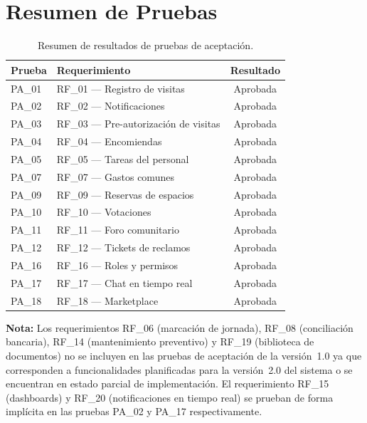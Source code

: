 \section{Resumen de Pruebas}

\begin{table}[H]
\centering
\small
\begin{tabular}{|l|l|c|}
\hline
\textbf{Prueba} & \textbf{Requerimiento} & \textbf{Resultado} \\ \hline
PA\_01 & RF\_01 — Registro de visitas & Aprobada \\ \hline
PA\_02 & RF\_02 — Notificaciones & Aprobada \\ \hline
PA\_03 & RF\_03 — Pre-autorización de visitas & Aprobada \\ \hline
PA\_04 & RF\_04 — Encomiendas & Aprobada \\ \hline
PA\_05 & RF\_05 — Tareas del personal & Aprobada \\ \hline
PA\_07 & RF\_07 — Gastos comunes & Aprobada \\ \hline
PA\_09 & RF\_09 — Reservas de espacios & Aprobada \\ \hline
PA\_10 & RF\_10 — Votaciones & Aprobada \\ \hline
PA\_11 & RF\_11 — Foro comunitario & Aprobada \\ \hline
PA\_12 & RF\_12 — Tickets de reclamos & Aprobada \\ \hline
PA\_16 & RF\_16 — Roles y permisos & Aprobada \\ \hline
PA\_17 & RF\_17 — Chat en tiempo real & Aprobada \\ \hline
PA\_18 & RF\_18 — Marketplace & Aprobada \\ \hline
\end{tabular}
\caption{Resumen de resultados de pruebas de aceptación.}
\label{tab:resumen_pruebas}
\end{table}

\noindent\textbf{Nota:} Los requerimientos RF\_06 (marcación de jornada), RF\_08 (conciliación bancaria), RF\_14 (mantenimiento preventivo) y RF\_19 (biblioteca de documentos) no se incluyen en las pruebas de aceptación de la versión~1.0 ya que corresponden a funcionalidades planificadas para la versión~2.0 del sistema o se encuentran en estado parcial de implementación. El requerimiento RF\_15 (dashboards) y RF\_20 (notificaciones en tiempo real) se prueban de forma implícita en las pruebas PA\_02 y PA\_17 respectivamente.
